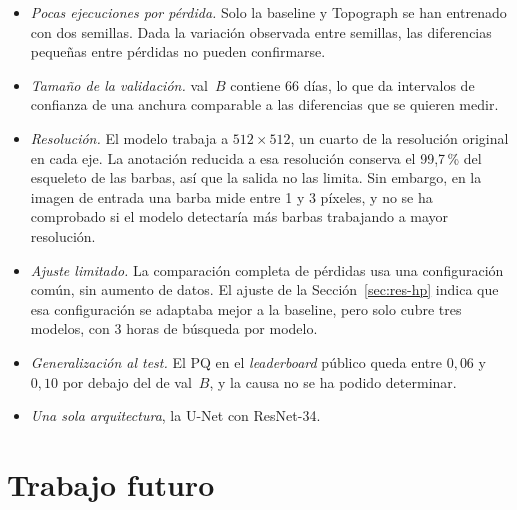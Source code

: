 \begin{itemize}
  \item \emph{Pocas ejecuciones por pérdida.} Solo la baseline y
  Topograph se han entrenado con dos semillas. Dada la variación
  observada entre semillas, las diferencias pequeñas entre pérdidas no
  pueden confirmarse.
  \item \emph{Tamaño de la validación.} val~$B$ contiene 66 días, lo
  que da intervalos de confianza de una anchura comparable a las
  diferencias que se quieren medir.
  \item \emph{Resolución.} El modelo trabaja a $512\times512$, un cuarto
  de la resolución original en cada eje. La anotación reducida a esa
  resolución conserva el 99,7\,\% del esqueleto de las barbas, así que
  la salida no las limita. Sin embargo, en la imagen de entrada una
  barba mide entre 1 y 3 píxeles, y no se ha comprobado si el modelo
  detectaría más barbas trabajando a mayor resolución.
  \item \emph{Ajuste limitado.} La comparación completa de pérdidas usa
  una configuración común, sin aumento de datos. El ajuste de la
  Sección~\ref{sec:res-hp} indica que esa configuración se adaptaba
  mejor a la baseline, pero solo cubre tres modelos, con 3 horas de
  búsqueda por modelo.
  \item \emph{Generalización al test.} El PQ en el \emph{leaderboard}
  público queda entre $0{,}06$ y $0{,}10$ por debajo del de val~$B$, y
  la causa no se ha podido determinar.
  \item \emph{Una sola arquitectura}, la U-Net con ResNet-34.
\end{itemize}

\section{Trabajo futuro}

